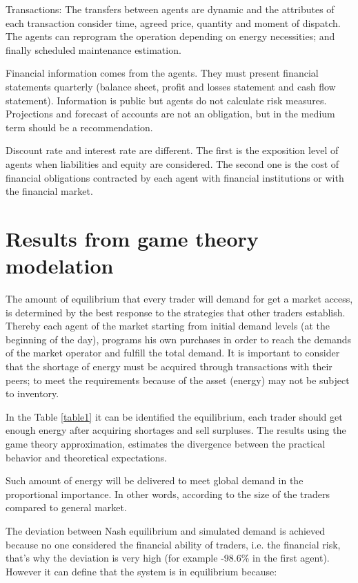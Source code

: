 \documentclass[12pt]{book}
\begin{document}
Transactions: The transfers between agents are dynamic and the attributes of each transaction consider time, agreed price, quantity and moment of dispatch. The agents can reprogram the operation depending on energy necessities; and finally scheduled maintenance estimation. 

Financial information comes from the agents. They must present financial statements quarterly (balance sheet, profit and losses statement and cash flow statement). Information is public but agents do not calculate risk measures. Projections and forecast of accounts are not an obligation, but in the medium term should be a recommendation.

Discount rate and interest rate are different. The first is the exposition level of agents when liabilities and equity are considered. The second one is the cost of financial obligations contracted by each agent with financial institutions or with the financial market.

\section{Results from game theory modelation}

The amount of equilibrium that every trader will demand for get a market access, is determined by the best response to the strategies that other traders establish. Thereby each agent of the market starting from initial demand levels (at the beginning of the day), programs his own purchases in order to reach the demands of the market operator and fulfill the total demand. It is important to consider that the shortage of energy must be acquired through transactions with their peers; to meet the requirements because of the asset (energy) may not be subject to inventory.

In the Table \ref{table1} it can be identified the equilibrium, each trader should get enough energy after acquiring shortages and sell surpluses. The results using the game theory approximation, estimates the divergence between the practical behavior and theoretical expectations. 

Such amount of energy will be delivered to meet global demand in the proportional importance. In other words, according to the size of the traders compared to general market.

The deviation between Nash equilibrium and simulated demand is achieved because no one considered the financial ability of traders, i.e. the financial risk, that's why the deviation is very high (for example -98.6\% in the first agent). However it can define that the system is in equilibrium because:
\end{document}
